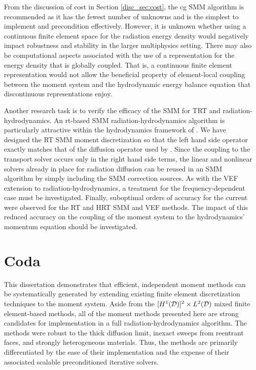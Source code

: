 \documentclass[../doc.tex]{subfiles}
\begin{document}
From the discussion of cost in Section \ref{disc_sec:cost}, the \gls{cg} SMM algorithm is recommended as it has the fewest number of unknowns and is the simplest to implement and precondition effectively. However, it is unknown whether using a continuous finite element space for the radiation energy density would negatively impact robustness and stability in the larger multiphysics setting. There may also be computational aspects associated with the use of a representation for the energy density that is globally coupled. That is, a continuous finite element representation would not allow the beneficial property of element-local coupling between the moment system and the hydrodynamic energy balance equation that discontinuous representations enjoy.  

Another research task is to verify the efficacy of the SMM for TRT and radiation-hydrodynamics. An \gls{rt}-based SMM radiation-hydrodynamics algorithm is particularly attractive within the hydrodynamics framework of \cite{blast}. We have designed the RT SMM moment discretization so that the left hand side operator exactly matches that of the diffusion operator used by \cite{blast}. Since the coupling to the transport solver occurs only in the right hand side terms, the linear and nonlinear solvers already in place for radiation diffusion can be reused in an SMM algorithm by simply including the SMM correction sources. As with the VEF extension to radiation-hydrodynamics, a treatment for the frequency-dependent case must be investigated. 
Finally, suboptimal orders of accuracy for the current were observed for the RT and HRT SMM and VEF methods. The impact of this reduced accuracy on the coupling of the moment system to the hydrodynamics' momentum equation should be investigated. 

\section{Coda}
This dissertation demonstrates that efficient, independent moment methods can be systematically generated by extending existing finite element discretization techniques to the moment system. Aside from the $[H^1(\mathcal{D})]^2\times L^2(\mathcal{D})$ mixed finite element-based methods, all of the moment methods presented here are strong candidates for implementation in a full radiation-hydrodynamics algorithm. The methods were robust to the thick diffusion limit, inexact sweeps from reentrant faces, and strongly heterogeneous materials. Thus, the methods are primarily differentiated by the ease of their implementation and the expense of their associated scalable preconditioned iterative solvers. 
\end{document}
